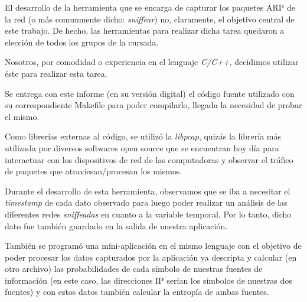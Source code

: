 \PARstartCal El desarrollo de la herramienta que se encarga de capturar
	los paquetes ARP de la red (o m\'as comunmente dicho: \textit{sniffear})
    no, claramente, el objetivo central de este trabajo. De hecho, las
    herramientas para realizar dicha tarea quedaron a elecci\'on de todos
    los grupos de la cursada.
    
\par Nosotros, por comodidad o experiencia en el lenguaje \textit{C/C++},
	decidimos utilizar \'este para realizar esta tarea.
    
\par Se entrega con este informe (en su versi\'on digital) el c\'odigo
	fuente utilizado con su correspondiente Makefile para poder compilarlo,
    llegada la necesidad de probar el mismo.
    
\par Como librer\'ias externas al c\'odigo, se utiliz\'o la \textit{libpcap},
	quiz\'as la librer\'ia m\'as utilizada por diversos softwares open source
    que se encuentran hoy d\'ia para interactuar con los dispositivos de red
    de las computadoras y observar el tr\'afico de paquetes que atraviesan/procesan
    los mismos.
    
\par Durante el desarrollo de esta herramienta, observamos que se iba a necesitar
	el \textit{timestamp} de cada dato observado para luego poder realizar un
    an\'alisis de las diferentes redes \textit{sniffeadas} en cuanto a la variable
    temporal. Por lo tanto, dicho dato fue tambi\'en guardado en la salida de
    nuestra aplicaci\'on.
    
\par Tambi\'en se program\'o una m\'ini-aplicaci\'on en el mismo lenguaje con
	el objetivo de poder procesar los datos capturados por la aplicaci\'on ya
    descripta y calcular (en otro archivo) las probabilidades de cada s\'imbolo
    de nuestras fuentes de informaci\'on (en este caso, las direcciones IP ser\'ian
    los s\'imbolos de nuestras dos fuentes) y con estos datos tambi\'en calcular
    la entrop\'ia de ambas fuentes.